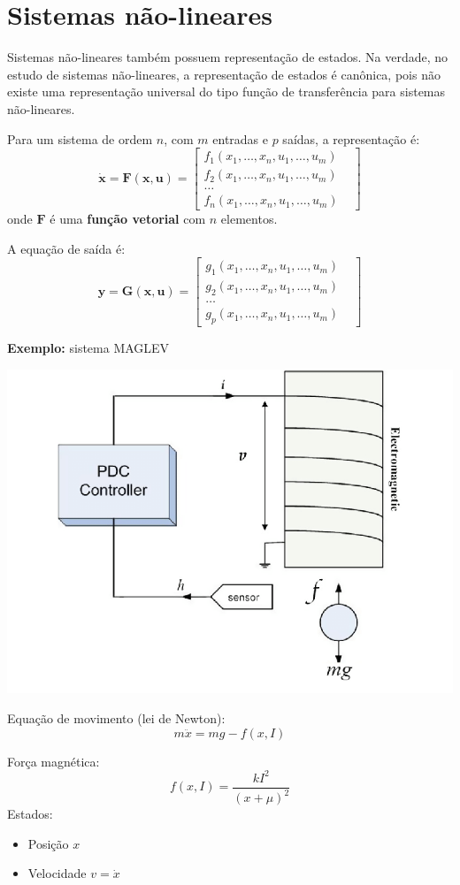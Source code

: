 \documentclass[
]{book}
\providecommand{\tightlist}{%
  \setlength{\itemsep}{0pt}\setlength{\parskip}{0pt}}
\begin{document}
\hypertarget{sistemas-nuxe3o-lineares}{%
\section{Sistemas não-lineares}\label{sistemas-nuxe3o-lineares}}

Sistemas não-lineares também possuem representação de estados. Na verdade, no estudo de sistemas não-lineares, a representação de estados é canônica, pois não existe uma representação universal do tipo função de transferência para sistemas não-lineares.

Para um sistema de ordem \(n\), com \(m\) entradas e \(p\) saídas, a representação é:
\[
  \dot{\mathbf{x}} = \mathbf{F(x,u)} = \begin{bmatrix}f_1(x_1,\ldots,x_n,u_1,\ldots, u_m) \\
  f_2(x_1,\ldots,x_n,u_1,\ldots, u_m) \\
  \ldots \\
  f_n(x_1,\ldots,x_n,u_1,\ldots, u_m) &\end{bmatrix}
\]
onde \(\mathbf{F}\) é uma \textbf{função vetorial} com \(n\) elementos.

A equação de saída é:
\[
  {\mathbf{y}} = \mathbf{G(x,u)} = \begin{bmatrix}g_1(x_1,\ldots,x_n,u_1,\ldots, u_m) \\
  g_2(x_1,\ldots,x_n,u_1,\ldots, u_m) \\
  \ldots \\
  g_p(x_1,\ldots,x_n,u_1,\ldots, u_m) &\end{bmatrix}
\]

\textbf{Exemplo:} sistema MAGLEV

\includegraphics[width=0.5\linewidth]{./figs/Maglev-system-model}

Equação de movimento (lei de Newton):
\[
  m\ddot{x} = mg - f(x,I)
\]

Força magnética:
\[
  f(x,I) = \frac{kI^2}{(x+\mu)^2}
\]
Estados:

\begin{itemize}
\tightlist
\item
  Posição \(x\)
\item
  Velocidade \(v = \dot{x}\)
\end{itemize}
\end{document}
